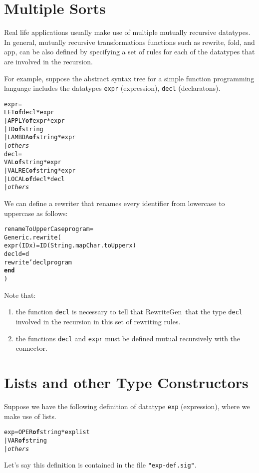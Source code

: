\documentclass{article}
\newcommand{\RewriteGen}{{\sf RewriteGen}}
\newcommand{\END}{{\bf end}}
\newcommand{\OF}{{\bf of}}
\begin{document}
\section{Multiple Sorts}

   Real life applications usually make use of multiple
mutually recursive datatypes.  In general, mutually recursive
transformations functions such as rewrite, fold, and app, can be also defined  
by specifying a set of rules for each of the datatypes that are involved
in the recursion.  

   For example, suppose the abstract syntax tree  
for a simple function programming language includes 
the datatypes \verb|expr| (expression), 
\verb|decl| (declaratons).

\begin{alltt}
  \DATATYPE expr = 
    LET \OF decl * expr
  | APPLY \OF expr * expr
  | ID \OF string
  | LAMBDA \OF string * expr
  | {\em others}
  \AND decl = 
    VAL \OF string * expr
  | VALREC \OF string * expr
  | LOCAL \OF decl * decl
  | {\em others}
\end{alltt}

We can define a rewriter that renames every identifier 
from lowercase to uppercase as follows:
\begin{alltt}
   \FUN renameToUpperCase program =  
   Generic.rewrite(
        \FUN expr (ID x) = ID(String.map Char.toUpper x)
        \AND decl d      = d
   \IN  rewrite'decl program
   \END
   )
\end{alltt}

Note that:
\begin{enumerate}
  \item the function \verb|decl| is necessary to tell that 
\RewriteGen\ that the type \verb|decl| involved in the recursion
in this set of rewriting rules.
  \item the functions \verb|decl| and \verb|expr| must be defined 
        mutual recursively with the \AND{} connector.
\end{enumerate}

\section{Lists and other Type Constructors}

Suppose we have the following definition of datatype
\verb|exp| (expression), where we make use of lists.
\begin{alltt}
  \DATATYPE exp = OPER \OF string * exp list
                | VAR \OF string
                | {\em others}
\end{alltt}
Let's say this definition is contained in the file \verb|"exp-def.sig"|.
\end{document}
